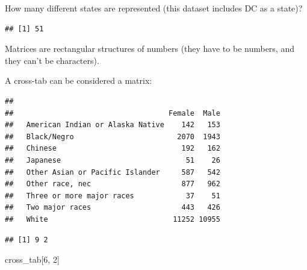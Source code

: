 \documentclass[]{book}
\newenvironment{Shaded}{\begin{snugshade}}{\end{snugshade}}
\newcommand{\DecValTok}[1]{\textcolor[rgb]{0.00,0.00,0.81}{#1}}
\newcommand{\KeywordTok}[1]{\textcolor[rgb]{0.13,0.29,0.53}{\textbf{#1}}}
\newcommand{\NormalTok}[1]{#1}
\newcommand{\OperatorTok}[1]{\textcolor[rgb]{0.81,0.36,0.00}{\textbf{#1}}}
\newcommand{\StringTok}[1]{\textcolor[rgb]{0.31,0.60,0.02}{#1}}
\theoremstyle{definition}
\theoremstyle{definition}
\theoremstyle{definition}
\theoremstyle{remark}
\begin{document}
How many different states are represented (this dataset includes DC as a state)?

\begin{Shaded}
\end{Shaded}

\begin{verbatim}
## [1] 51
\end{verbatim}

Matrices are rectangular structures of numbers (they have to be numbers, and they can't be characters).

A cross-tab can be considered a matrix:

\begin{Shaded}
\end{Shaded}

\begin{verbatim}
##                                   
##                                    Female  Male
##   American Indian or Alaska Native    142   153
##   Black/Negro                        2070  1943
##   Chinese                             192   162
##   Japanese                             51    26
##   Other Asian or Pacific Islander     587   542
##   Other race, nec                     877   962
##   Three or more major races            37    51
##   Two major races                     443   426
##   White                             11252 10955
\end{verbatim}

\begin{Shaded}
\end{Shaded}

\begin{verbatim}
## [1] 9 2
\end{verbatim}

\begin{Shaded}
\begin{Highlighting}[]
\NormalTok{cross_tab[}\DecValTok{6}\NormalTok{, }\DecValTok{2}\NormalTok{]}
\end{Highlighting}
\end{Shaded}
\end{document}
